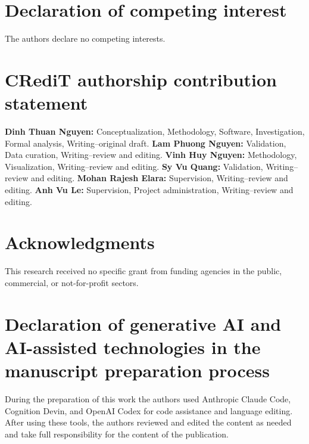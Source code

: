 \documentclass[a4paper,fleqn]{cas-dc}
\begin{document}
\section*{Declaration of competing interest}

The authors declare no competing interests.

\section*{CRediT authorship contribution statement}

\textbf{Dinh Thuan Nguyen:} Conceptualization, Methodology, Software, Investigation, Formal analysis, Writing--original draft. \textbf{Lam Phuong Nguyen:} Validation, Data curation, Writing--review and editing. \textbf{Vinh Huy Nguyen:} Methodology, Visualization, Writing--review and editing. \textbf{Sy Vu Quang:} Validation, Writing--review and editing. \textbf{Mohan Rajesh Elara:} Supervision, Writing--review and editing. \textbf{Anh Vu Le:} Supervision, Project administration, Writing--review and editing.

\section*{Acknowledgments}

This research received no specific grant from funding agencies in the public, commercial, or not-for-profit sectors.

\section*{Declaration of generative AI and AI-assisted technologies in the manuscript preparation process}

During the preparation of this work the authors used Anthropic Claude Code, Cognition Devin, and OpenAI Codex for code assistance and language editing. After using these tools, the authors reviewed and edited the content as needed and take full responsibility for the content of the publication.



\end{document}
